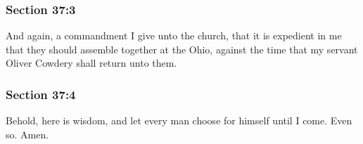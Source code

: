 
	\subsubsection{Section 37:3} %
		\label{DC37-3}

		And again, a commandment I give unto the church, that it is expedient in me that they should assemble together at the Ohio, against the time that my servant Oliver Cowdery shall return unto them.


	\subsubsection{Section 37:4} %
		\label{DC37-4}

		Behold, here is wisdom, and let every man choose for himself until I come.  Even so.  Amen.

